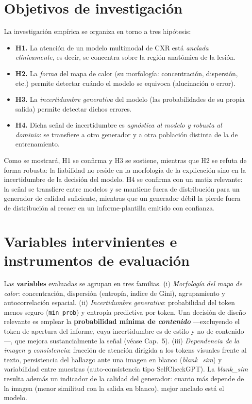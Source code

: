\section{Objetivos de investigación}
La investigación empírica se organiza en torno a tres hipótesis:
\begin{itemize}
  \item \textbf{H1.} La atención de un modelo multimodal de CXR está \textit{anclada
  clínicamente}, es decir, se concentra sobre la región anatómica de la lesión.
  \item \textbf{H2.} La \textit{forma} del mapa de calor (su morfología: concentración,
  dispersión, etc.) permite detectar cuándo el modelo se equivoca (alucinación o error).
  \item \textbf{H3.} La \textit{incertidumbre generativa} del modelo (las probabilidades de su
  propia salida) permite detectar dichos errores.
  \item \textbf{H4.} Dicha señal de incertidumbre es \textit{agnóstica al modelo y robusta al
  dominio}: se transfiere a otro generador y a otra población distinta de la de entrenamiento.
\end{itemize}
Como se mostrará, H1 se confirma y H3 se sostiene, mientras que H2 se refuta de forma robusta: la
fiabilidad no reside en la morfología de la explicación sino en la incertidumbre de la decisión del
modelo. H4 se confirma con un matiz relevante: la señal se transfiere entre modelos y se mantiene
fuera de distribución para un generador de calidad suficiente, mientras que un generador débil la
pierde fuera de distribución al recaer en un informe-plantilla emitido con confianza.

\section{Variables intervinientes e instrumentos de evaluación}
Las \textbf{variables} evaluadas se agrupan en tres familias. (i) \textit{Morfología del mapa de
calor}: concentración, dispersión (entropía, índice de Gini), agrupamiento y autocorrelación
espacial. (ii) \textit{Incertidumbre generativa}: probabilidad del token menos seguro
(\texttt{min\_prob}) y entropía predictiva por token. Una decisión de diseño relevante es emplear la
\textbf{probabilidad mínima de \emph{contenido}} —excluyendo el token de apertura del informe, cuya
incertidumbre es de estilo y no de contenido—, que mejora sustancialmente la señal (véase
Cap.~5). (iii) \textit{Dependencia de la imagen y consistencia}: fracción de atención dirigida a los
tokens visuales frente al texto, persistencia del hallazgo ante una imagen en blanco
(\emph{blank\_sim}) y variabilidad entre muestras (auto-consistencia tipo SelfCheckGPT). La
\emph{blank\_sim} resulta además un indicador de la calidad del generador: cuanto más depende de la
imagen (menor similitud con la salida en blanco), mejor anclado está el modelo.

